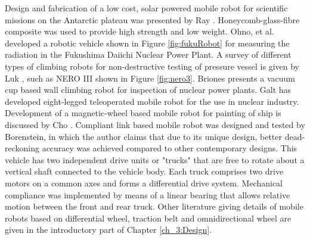 Design and fabrication of a low cost, solar powered mobile robot for  scientific missions on the Antarctic plateau was presented by Ray  \cite{ray2005design}. Honeycomb-glass-fibre composite was used to provide high strength and low weight. Ohno, et al. \cite{ohno2011robotic}   developed a robotic  vehicle shown in Figure \ref{fig:fukuRobot} for measuring the radiation in the Fukushima Daiichi Nuclear Power Plant. A survey of different types of climbing robots for non-destructive testing of pressure vessel is given by Luk \cite{luk2006tele}, such as NERO III shown in Figure \ref{fig:nero3}.  Briones \cite{briones1994wall} presents a vacuum cup based wall climbing robot for inspection of  nuclear power plants. Galt \cite{galt1997tele} has developed eight-legged teleoperated mobile robot for the use in nuclear industry. Development of a magnetic-wheel based mobile robot for painting of ship is discussed by Cho \cite{cho2013study}. Compliant link based mobile robot was designed and tested by Borenstein\cite{borenstein1995control}, in which the author claims that due to its unique design, better dead-reckoning accuracy was achieved compared to other contemporary designs. This vehicle has two independent drive units or "trucks" that are free to rotate about a vertical shaft connected to the vehicle body. Each truck comprises two drive motors on a common axes and forms a differential drive system. Mechanical compliance was implemented by means of a linear bearing that allows relative motion between the front and rear truck. Other literature giving details of  mobile robots based on   differential wheel, traction belt and omnidirectional wheel are given in the introductory part of Chapter \ref{ch_3:Design}.
